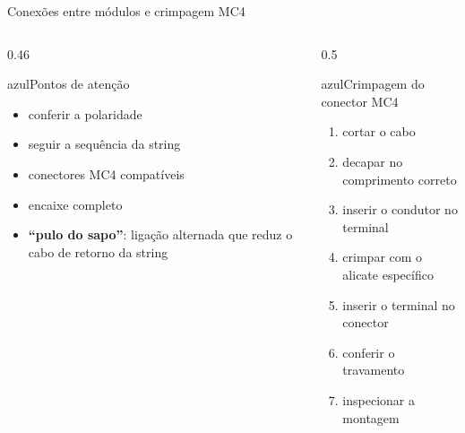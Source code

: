 \documentclass[aspectratio=169,10pt,xcolor=table]{beamer}
\begin{document}
\begin{frame}{Conexões entre módulos e crimpagem MC4}
  \begin{columns}[T]
    \begin{column}{0.46\textwidth}
      \begin{card}[equal height group=mc]{azul}{\faPlug\enspace Pontos de atenção}
        \begin{itemize}
          \item conferir a polaridade
          \item seguir a sequência da string
          \item conectores MC4 compatíveis
          \item encaixe completo
          \item \textbf{``pulo do sapo''}: ligação alternada que reduz o cabo de retorno da string
        \end{itemize}
      \end{card}
    \end{column}
    \begin{column}{0.5\textwidth}
      \begin{card}[equal height group=mc]{azul}{\faTools\enspace Crimpagem do conector MC4}
        \begin{enumerate}
          \item cortar o cabo
          \item decapar no comprimento correto
          \item inserir o condutor no terminal
          \item crimpar com o alicate específico
          \item inserir o terminal no conector
          \item conferir o travamento
          \item inspecionar a montagem
        \end{enumerate}
      \end{card}
    \end{column}
  \end{columns}
\end{frame}
\end{document}
